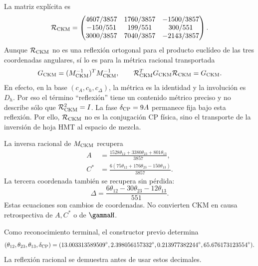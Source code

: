 La matriz expl\'icita es
\begin{equation}
\label{rm:eq:modular-Rckm-matrix}
\mathcal R_{\rm CKM}=
\begin{pmatrix}
4607/3857&1760/3857&-1500/3857\\
-150/551&199/551&300/551\\
3000/3857&7040/3857&-2143/3857
\end{pmatrix}.
\end{equation}
Aunque \(\mathcal R_{\rm CKM}\) no es una reflexi\'on ortogonal para el
producto eucl\'ideo de las tres coordenadas angulares, s\'i lo es para la
m\'etrica racional transportada
\begin{equation}
\label{rm:eq:modular-ckm-metric}
G_{\rm CKM}=(M_{\rm CKM}^{-1})^TM_{\rm CKM}^{-1},
\qquad
\mathcal R_{\rm CKM}^TG_{\rm CKM}\mathcal R_{\rm CKM}=G_{\rm CKM}.
\end{equation}
En efecto, en la base \((c_A,c_h,c_\Delta)\), la m\'etrica es la identidad
y la involuci\'on es \(D_h\). Por eso el t\'ermino ``reflexi\'on'' tiene un
contenido m\'etrico preciso y no describe s\'olo que
\(\mathcal R_{\rm CKM}^2=I\).
La fase \(\delta_{\rm CP}=9A\) permanece fija bajo esta reflexi\'on. Por
ello, \(\mathcal R_{\rm CKM}\) no es la conjugaci\'on CP f\'isica, sino el
transporte de la inversi\'on de hoja HMT al espacio de mezcla.

La inversa racional de \(M_{\rm CKM}\) recupera
\begin{align}
A&=\frac{1528\theta_{12}+3380\theta_{23}+801\theta_{13}}{3857},
\label{rm:eq:modular-A-from-ckm}\\
C^*&=\frac{6(75\theta_{12}+176\theta_{23}-150\theta_{13})}{3857}.
\label{rm:eq:modular-C-from-ckm}
\end{align}
La tercera coordenada tambi\'en se recupera sin p\'erdida:
\begin{equation}
\label{rm:eq:modular-Delta-from-ckm}
\Delta
=\frac{6\theta_{12}-30\theta_{23}-12\theta_{13}}{551}.
\end{equation}
Estas ecuaciones son cambios de coordenadas. No convierten CKM en causa
retrospectiva de \(A,C^*\) o de \(\gammaH\).

Como reconocimiento terminal, el constructor previo determina
\begin{equation}
\label{rm:eq:modular-ckm-values}
(\theta_{12},\theta_{23},\theta_{13},\delta_{\rm CP})
=(13.003313589509^\circ,
2.398056157332^\circ,
0.213977382244^\circ,
65.676173123554^\circ).
\end{equation}
La reflexi\'on racional se demuestra antes de usar estos decimales.

